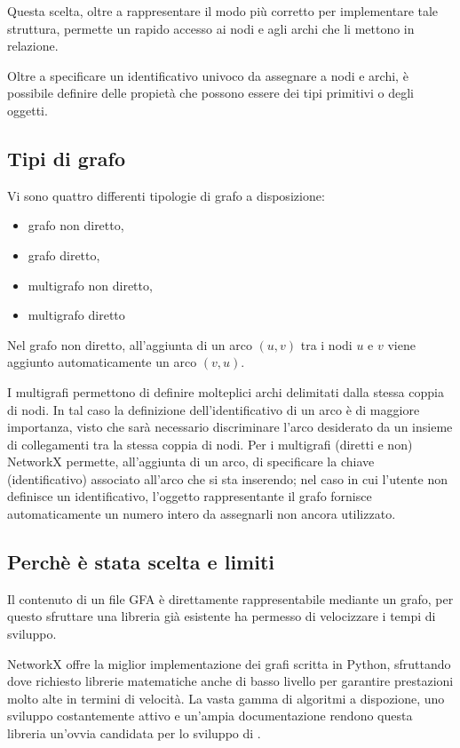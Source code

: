 Questa scelta, oltre a rappresentare il modo più corretto per
implementare tale struttura\cite{python-graph}, permette un rapido
accesso ai nodi e agli archi che li mettono in relazione.

Oltre a specificare un identificativo univoco da assegnare a nodi e archi,
è possibile definire delle propietà che possono essere dei tipi primitivi
o degli oggetti.

\subsection{Tipi di grafo}
Vi sono quattro differenti tipologie di grafo a disposizione:
\begin{itemize}
	\item grafo non diretto,
	\item grafo diretto,
	\item multigrafo non diretto,
	\item multigrafo diretto
\end{itemize}
Nel grafo non diretto, all'aggiunta di un arco $(u, v)$ tra
i nodi $u$ e $v$ viene aggiunto automaticamente un
arco $(v, u)$.

I multigrafi permettono di definire molteplici archi delimitati dalla
stessa coppia di nodi. In tal caso la definizione dell'identificativo
di un arco è di maggiore importanza, visto che sarà necessario
discriminare l'arco desiderato da un insieme di collegamenti
tra la stessa coppia di nodi. Per i multigrafi (diretti e non)
NetworkX permette, all'aggiunta di un arco, di specificare la chiave
(identificativo) associato all'arco che si sta inserendo; nel caso in cui
l'utente non definisce un identificativo, l'oggetto rappresentante il grafo
fornisce automaticamente un numero intero da assegnarli non ancora
utilizzato.

\subsection{Perchè è stata scelta e limiti}
Il contenuto di un file GFA è direttamente rappresentabile mediante
un grafo, per questo sfruttare una libreria già esistente ha permesso
di velocizzare i tempi di sviluppo.

NetworkX offre la miglior implementazione dei grafi scritta in Python,
sfruttando dove richiesto librerie matematiche anche di basso livello
per garantire prestazioni molto alte in termini di velocità. La vasta
gamma di algoritmi a dispozione, uno sviluppo costantemente
attivo\cite{networkx-github} e un'ampia documentazione rendono
questa libreria un'ovvia candidata per lo sviluppo di \pygfa.

